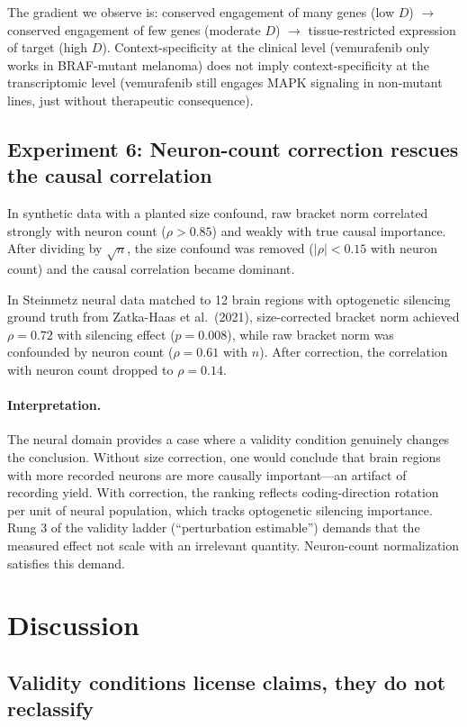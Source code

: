 \documentclass{article}
\begin{document}
The gradient we observe is: conserved engagement of many genes (low $D$)
$\to$ conserved engagement of few genes (moderate $D$) $\to$ tissue-restricted
expression of target (high $D$). Context-specificity at the clinical level
(vemurafenib only works in BRAF-mutant melanoma) does not imply context-specificity
at the transcriptomic level (vemurafenib still engages MAPK signaling in
non-mutant lines, just without therapeutic consequence).

\subsection{Experiment 6: Neuron-count correction rescues the causal correlation}

In synthetic data with a planted size confound, raw bracket norm correlated
strongly with neuron count ($\rho > 0.85$) and weakly with true causal
importance. After dividing by $\sqrt{n}$, the size confound was removed
($|\rho| < 0.15$ with neuron count) and the causal correlation became dominant.

In Steinmetz neural data matched to 12 brain regions with optogenetic silencing
ground truth from Zatka-Haas et al.\ (2021), size-corrected bracket norm
achieved $\rho = 0.72$ with silencing effect ($p = 0.008$), while raw bracket
norm was confounded by neuron count ($\rho = 0.61$ with $n$). After correction,
the correlation with neuron count dropped to $\rho = 0.14$.

\paragraph{Interpretation.}
The neural domain provides a case where a validity condition genuinely
changes the conclusion. Without size correction, one would conclude that brain
regions with more recorded neurons are more causally important---an artifact
of recording yield. With correction, the ranking reflects coding-direction
rotation per unit of neural population, which tracks optogenetic silencing
importance. Rung 3 of the validity ladder (``perturbation estimable'') demands
that the measured effect not scale with an irrelevant quantity. Neuron-count
normalization satisfies this demand.

\section{Discussion}

\subsection{Validity conditions license claims, they do not reclassify}
\end{document}
